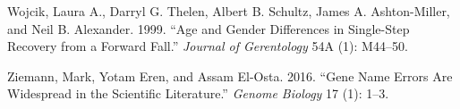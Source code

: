 \documentclass[
  11pt,
  a4paper,
]{krantz}
\newlength{\cslhangindent}
\newenvironment{CSLReferences}[2] %
 {\begin{list}{}{%
  \setlength{\itemindent}{0pt}
  \setlength{\leftmargin}{0pt}
  \setlength{\parsep}{0pt}
  \ifodd #1
   \setlength{\leftmargin}{\cslhangindent}
   \setlength{\itemindent}{-1\cslhangindent}
  \fi
  \setlength{\itemsep}{#2\baselineskip}}}
 {\end{list}}
\begin{document}
\begin{CSLReferences}{1}{1}
Wojcik, Laura A., Darryl G. Thelen, Albert B. Schultz, James A. Ashton-Miller, and Neil B. Alexander. 1999. {``Age and Gender Differences in Single-Step Recovery from a Forward Fall.''} \emph{Journal of Gerentology} 54A (1): M44--50.

Ziemann, Mark, Yotam Eren, and Assam El-Osta. 2016. {``Gene Name Errors Are Widespread in the Scientific Literature.''} \emph{Genome Biology} 17 (1): 1--3.

\end{CSLReferences}

\backmatter
{\small\printindex}
\end{document}
